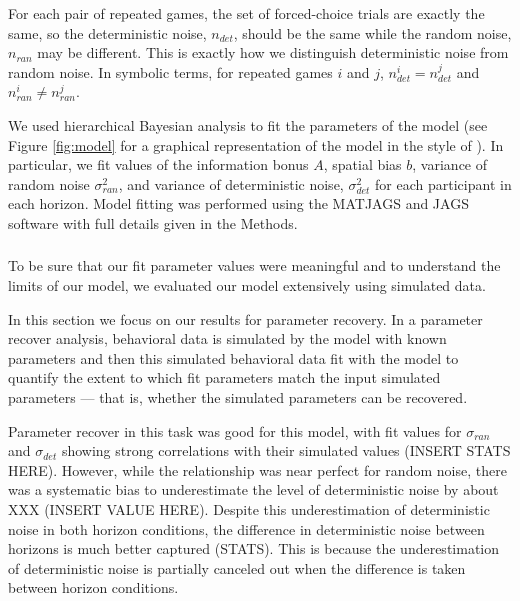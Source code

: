 \documentclass[12pt]{article}
\begin{document}
{%

For each pair of repeated games, the set of forced-choice trials are exactly the same, so the deterministic noise, $n_{det}$, should be the same while the random noise, $n_{ran}$ may be different. This is exactly how we distinguish deterministic noise from random noise. In symbolic terms, for repeated games $i$ and $j$,  $n_{det}^i=n_{det}^j$  and $n_{ran}^i \neq n_{ran}^j$.

We used hierarchical Bayesian analysis to fit the parameters of the model (see Figure \ref{fig:model} for a graphical representation of the model in the style of \cite{lee2014}). In particular, we fit values of the information bonus $A$, spatial bias $b$, variance of random noise $\sigma_{ran}^2$, and variance of deterministic noise, $\sigma_{det}^2$ for each participant in each horizon. Model fitting was performed using the MATJAGS and JAGS software \citep{jags, matjags} with full details given in the Methods.  

\subsubsection*{\label{ch:appendix:bayesrecovery}}
To be sure that our fit parameter values were meaningful and to understand the limits of our model, we evaluated our model extensively using simulated data. 
	
	In this section we focus on our results for parameter recovery. In a parameter recover analysis, behavioral data is simulated by the model with known parameters and then this simulated behavioral data fit with the model to quantify the extent to which fit parameters match the input simulated parameters --- that is, whether the simulated parameters can be recovered.  
	
	Parameter recover in this task was good for this model, with fit values for $\sigma_{ran}$ and $\sigma_{det}$ showing strong correlations with their simulated values (INSERT STATS HERE). However, while the relationship was near perfect for random noise, there was a systematic bias to underestimate the level of deterministic noise by about XXX (INSERT VALUE HERE). Despite this underestimation of deterministic noise in both horizon conditions, the difference in deterministic noise between horizons is much better captured (STATS). This is because the underestimation of deterministic noise is partially canceled out when the difference is taken between horizon conditions.
	
}
\end{document}
